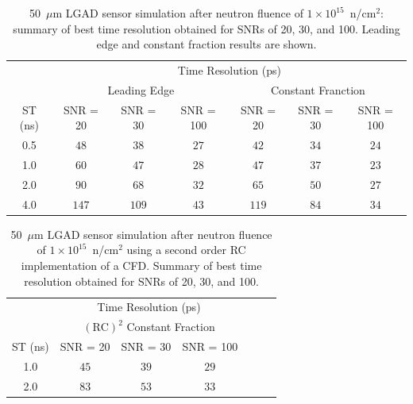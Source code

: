 \documentclass[preprint,1p]{elsarticle}
\begin{document}
  \begin{table}\label{tab:shaping_time_1e_15}
      \begin{tabular}{c|ccc|ccc}
      \multicolumn{1}{c}{}& \multicolumn{6}{c}{Time Resolution (ps)} \\
      \multicolumn{1}{c}{}&\multicolumn{3}{c}{Leading Edge} & \multicolumn{3}{c}{Constant Franction}\\ \hline
      ST (ns) & SNR = 20   & SNR = 30      & SNR = 100     & SNR = 20      & SNR = 30      & SNR = 100 \\
      0.5 & $48$    & $38$    & $27$  & $42$    & $34$  & $24$ \\
      1.0 & $60$    & $47$    & $28$  & $47$    & $37$  & $23$ \\
      2.0 & $90$    & $68$    & $32$  & $65$    & $50$  & $27$ \\
      4.0 & $147$  & $109$  & $43$  & $119$  & $84$  & $34$ \\
      \end{tabular}
      \caption{50~$\mu$m LGAD sensor simulation after neutron fluence of
       $1\times 10^{15}$~n/cm$^2$: summary of best time resolution obtained for SNRs
      of 20, 30, and 100. Leading edge and constant fraction results are shown.}
   \end{table}


 \begin{table}\label{tab:shaping_time_1e15_psCFD}
     \begin{tabular}{c|ccc|ccc}
     \multicolumn{1}{c}{}& \multicolumn{3}{c}{Time Resolution (ps)} \\
     \multicolumn{1}{c}{}& \multicolumn{3}{c}{$\mathrm{(RC)}^{2}$ Constant Fraction}\\ \hline
     ST (ns) & SNR = 20      & SNR = 30      & SNR = 100 \\
     1.0 & $45$  & $ 39$  & $29$ \\
     2.0 & $83$  & $ 53$  & $33$ \\     
     \end{tabular}
     \caption{50~$\mu$m LGAD sensor simulation after neutron fluence of
      $1\times 10^{15}$~n/cm$^2$ using a second order RC implementation of a CFD. 
      Summary of best time resolution obtained for SNRs
     of 20, 30, and 100. }
  \end{table}
  
  
\end{document}
